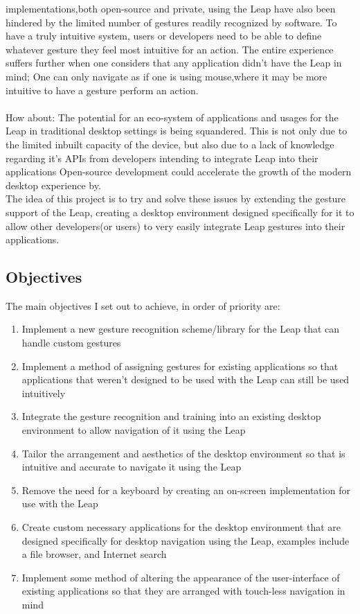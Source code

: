 \documentclass[a4paper]{article}
\begin{document}
implementations,both open-source and private, using the Leap have also been hindered by the limited number of gestures readily recognized by software. To have a truly intuitive system, users or developers need to be able to define whatever gesture they feel most intuitive for an action. The entire experience suffers further when one considers that any application didn't have the Leap in mind; One can only navigate as if one is using mouse,where it may be more intuitive to have a gesture perform an action. \\ \\How about: The potential for an eco-system of applications and usages for the Leap in traditional desktop settings is being squandered. This is not only due to the limited inbuilt capacity of the device, but also due to a lack of knowledge regarding it's APIs from developers intending to integrate Leap into their applications Open-source development could accelerate the growth of the modern desktop experience by. \\The idea of this project is to try and solve these issues by extending the gesture support of the Leap, creating a desktop environment designed specifically for it to allow other developers(or users) to very easily integrate Leap gestures into their applications.
\newpage
\subsection{Objectives}\label{Objectives}
The main objectives I set out to achieve, in order of priority are: 
\begin{enumerate}
\item Implement a new gesture recognition scheme/library for the Leap that can handle custom gestures
\item Implement a method of assigning gestures for existing applications so that applications that weren't designed to be used with the Leap can still be used intuitively 
\item Integrate the gesture recognition and training into an existing desktop environment to allow navigation of it using the Leap
\item Tailor the arrangement and aesthetics of the desktop environment so that is intuitive and accurate to navigate it using the Leap
\item Remove the need for a keyboard by creating an on-screen implementation for use with the Leap
\item Create custom necessary applications for the desktop environment that are designed specifically for desktop navigation using the Leap, examples include a file browser, and Internet search
\item Implement some method of altering the appearance of the user-interface of existing applications so that they are arranged with touch-less navigation in mind
\end{enumerate}
\newpage
\end{document}
